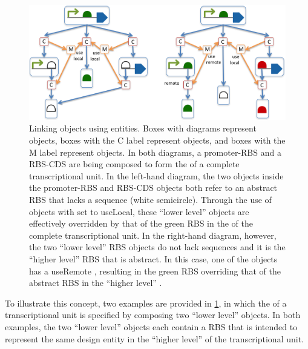 \begin{figure}[ht]
\begin{center}
\includegraphics[scale=0.95]{images/MapsTo_Diagram3}
\caption{Linking  objects using  entities. Boxes with diagrams represent  objects, boxes with the C label represent  objects, and boxes with the M label represent  objects. In both diagrams, a promoter-RBS  and a RBS-CDS  are being composed to form the  of a complete transcriptional unit. In the left-hand diagram, the two  objects inside the promoter-RBS  and RBS-CDS  objects both refer to an abstract RBS  that lacks a sequence (white semicircle). Through the use of  objects with  set to useLocal, these ``lower level''  objects are effectively overridden by that of the green RBS in the  of the complete transcriptional unit. In the right-hand diagram, however, the two ``lower level'' RBS  objects do not lack sequences and it is the ``higher level'' RBS  that is abstract. In this case, one of the  objects has a useRemote , resulting in the green RBS  overriding that of the abstract RBS in the ``higher level'' .}
\label{image:maps_to_diagram2}
\end{center}
\end{figure}

To illustrate this concept, two examples are provided in \ref{image:maps_to_diagram2}, in which the  of a transcriptional unit is specified by composing two ``lower level''  objects.
In both examples, the two ``lower level''  objects each contain a RBS  that is intended to represent the same design entity in the ``higher level''  of the transcriptional unit.

